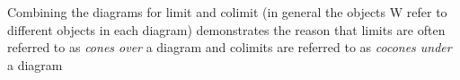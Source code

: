 \begin{frame}
Combining the diagrams for limit and colimit (in general the objects W refer to different objects in each diagram) demonstrates the reason that limits are often referred to as {\it cones over} a diagram and colimits are referred to as {\it cocones under} a diagram
\end{frame}